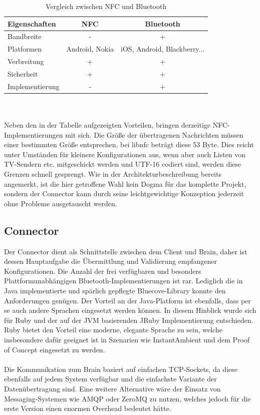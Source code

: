  \begin{table}
     \centering
     \begin{tabular}{| l | c | c |}
			\hline
      \textbf{Eigenschaften} & \textbf{NFC}  & \textbf{Bluetooth} \\ \hline
       Bandbreite  & -	& + \\ \hline
       Platformen  & Android, Nokia & iOS, Android, Blackberry...   \\ \hline
       Verbreitung & + & +   \\ \hline
			 Sicherheit  & + & + \\ \hline
			 Implementierung  & - & + \\ \hline
			
     \end{tabular} 
 
     \caption{Vergleich zwischen NFC und Bluetooth }
 
   \end{table}

\\\\
Neben den in der Tabelle aufgezeigten Vorteilen, bringen derzeitige NFC-Implementierungen mit sich. Die Größe der übertragenen Nachrichten müssen einer bestimmten Größe entsprechen, bei libnfc beträgt diese 53 Byte. Dies reicht unter Umständen für kleinere Konfigurationen aus, wenn aber auch Listen von TV-Sendern etc. mitgeschickt werden und UTF-16 codiert sind, werden diese Grenzen schnell gesprengt. 
Wie in der Architekturbeschreibung bereits angemerkt, ist die hier getroffene Wahl kein Dogma für das komplette Projekt, sondern der Connector kann durch seine leichtgewichtige Konzeption jederzeit ohne Probleme ausgetauscht werden.


\subsection{Connector}

Der Connector dient als Schnittstelle zwischen dem Client und Brain, daher ist dessen Hauptaufgabe die Übermittlung und Validierung empfangener Konfigurationen. Die Anzahl der frei verfügbaren und besonders Plattformunabhängigen Bluetooth-Implementierungen ist rar. Lediglich die in Java implementierte und spärlich gepflegte Bluecove-Library konnte den Anforderungen genügen. Der Vorteil an der Java-Platform ist ebenfalls, dass per se auch andere Sprachen eingesetzt werden können. In diesem Hinblick wurde sich für Ruby und der auf der JVM basierenden JRuby Implementierung entschieden. Ruby bietet den Vorteil eine moderne, elegante Sprache zu sein, welche insbesondere dafür geeignet ist in Szenarien wie InstantAmbient und dem Proof of Concept eingesetzt zu werden.
\\\\
Die Kommunikation zum Brain basiert auf einfachen TCP-Sockets, da diese ebenfalls auf jedem System verfügbar und die einfachste Variante der Datenübertragung sind. Eine weitere Alternative wäre der Einsatz von Messaging-Systemen wie AMQP oder ZeroMQ zu nutzen, welches jedoch für die erste Version einen enormen Overhead bedeutet hätte.


